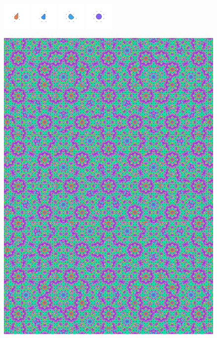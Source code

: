 \documentclass[text.tex]{subfiles}
\begin{document}
\begin{figure}[h!]
\includegraphics[width=0.12\textwidth]{img/results/circle8/circle8_232233_(65_-25alpha_2)_014.pdf}
\includegraphics[width=0.12\textwidth]{img/results/circle8/circle8_232233_(65_-25alpha_2)_015.pdf}
\includegraphics[width=0.12\textwidth]{img/results/circle8/circle8_232233_(65_-25alpha_2)_016.pdf}
\includegraphics[width=0.12\textwidth]{img/results/circle8/circle8_232233_(65_-25alpha_2)_017.pdf}
\end{figure}

\begin{figure}[h!]
\centering
\includegraphics[width=1\textwidth]{img/results/circle8/quasi_circle_232233_(65_-25alpha_2).pdf}
\end{figure}
\end{document}
